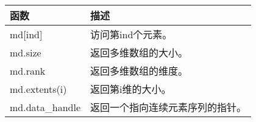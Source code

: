 \begin{longtable}[c]{|l|l|}
\hline
\textbf{函数} & \textbf{描述}                                       \\ \hline
\endfirsthead
%
\endhead
%
md{[}ind{]}       & 访问第ind个元素。                                \\ \hline
md.size           & 返回多维数组的大小。            \\ \hline
md.rank           & 返回多维数组的维度。      \\ \hline
md.extents(i)     & 返回第i维的大小。                   \\ \hline
md.data\_handle   & 返回一个指向连续元素序列的指针。 \\ \hline
\end{longtable}


































